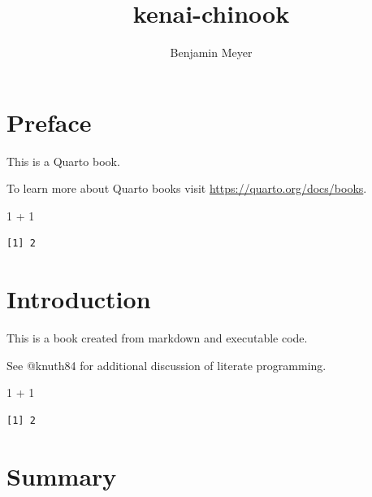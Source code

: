 \documentclass[
  letterpaper,
  DIV=11,
  numbers=noendperiod]{scrreprt}
\title{kenai-chinook}
\author{Benjamin Meyer}
\date{}
\newenvironment{Shaded}{\begin{snugshade}}{\end{snugshade}}
\newcommand{\DecValTok}[1]{\textcolor[rgb]{0.68,0.00,0.00}{#1}}
\newcommand{\SpecialCharTok}[1]{\textcolor[rgb]{0.37,0.37,0.37}{#1}}
\renewcommand*\contentsname{Table of contents}
\newcommand\contentsname{Table of contents}
\begin{document}
\maketitle

\renewcommand*\contentsname{Table of contents}
{
\setcounter{tocdepth}{2}
\tableofcontents
}


\chapter*{Preface}\label{preface}


This is a Quarto book.

To learn more about Quarto books visit
\url{https://quarto.org/docs/books}.

\begin{Shaded}
\begin{Highlighting}[]
\DecValTok{1} \SpecialCharTok{+} \DecValTok{1}
\end{Highlighting}
\end{Shaded}

\begin{verbatim}
[1] 2
\end{verbatim}


\chapter{Introduction}\label{introduction}

This is a book created from markdown and executable code.

See @knuth84 for additional discussion of literate programming.

\begin{Shaded}
\begin{Highlighting}[]
\DecValTok{1} \SpecialCharTok{+} \DecValTok{1}
\end{Highlighting}
\end{Shaded}

\begin{verbatim}
[1] 2
\end{verbatim}


\chapter{Summary}\label{summary}
\end{document}
